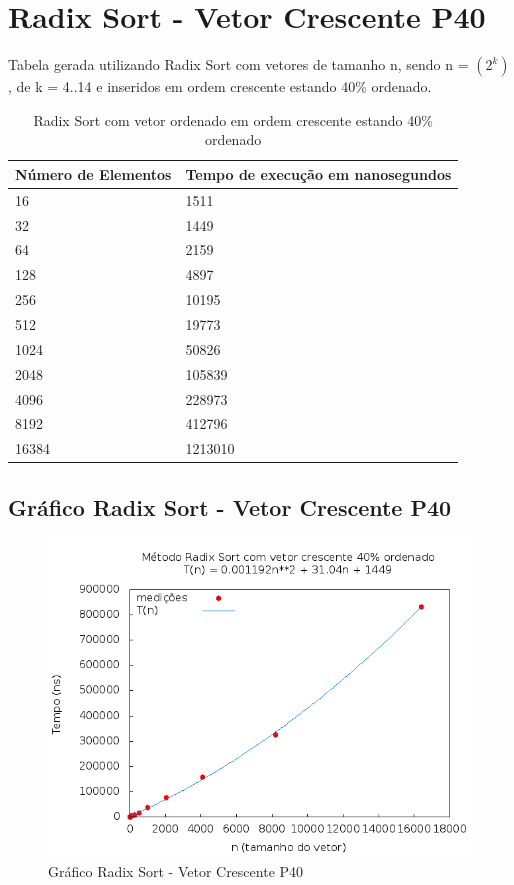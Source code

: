 \documentclass[12pt,a4paper,twoside]{report}
\begin{document}
\section{Radix Sort - Vetor Crescente P40}
Tabela gerada utilizando Radix Sort com vetores de tamanho n, sendo n = $(2^k)$, de k = 4..14 e inseridos em ordem crescente estando 40\% ordenado.
\begin{table}[H]
\centering
\caption{Radix Sort com vetor ordenado em ordem crescente estando 40\% ordenado}
\label{my-label}
\begin{tabular}{|l|l|}
\hline
\multicolumn{1}{|c|}{\textbf{Número de Elementos}} & \multicolumn{1}{c|}{\textbf{Tempo de execução em nanosegundos}} \\ \hline
16 & 1511 \\ \hline
32 & 1449 \\ \hline
64 & 2159 \\ \hline
128 & 4897 \\ \hline
256 & 10195 \\ \hline
512 & 19773 \\ \hline
1024 & 50826 \\ \hline
2048 & 105839 \\ \hline
4096 & 228973 \\ \hline
8192 & 412796 \\ \hline
16384 & 1213010 \\ \hline
\end{tabular}
\end{table}

\subsection{Gráfico Radix Sort - Vetor Crescente P40}
\begin{figure}[H]
    \centering
    \includegraphics[width=0.7\linewidth]{graficos/RadixSort/vIntCrescenteP40/vIntCrescenteP40.png}
  \caption{Gráfico Radix Sort - Vetor Crescente P40}
\end{figure}
\end{document}
